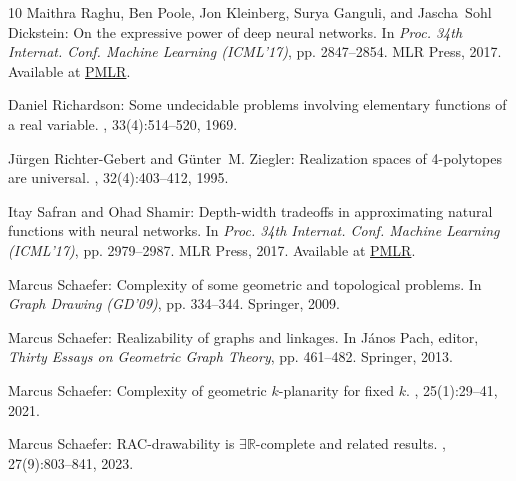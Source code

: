 \begin{thebibliography}{10}
{\sc Maithra Raghu, Ben Poole, Jon Kleinberg, Surya Ganguli, and Jascha~Sohl
  Dickstein}: On the expressive power of deep neural networks.
\newblock In {\em Proc. 34th Internat. Conf. Machine Learning (ICML'17)}, pp.
  2847--2854. MLR Press, 2017.
\newblock Available at
  \href{https://proceedings.mlr.press/v70/raghu17a.html}{PMLR}.

{\sc Daniel Richardson}: Some undecidable problems involving elementary
  functions of a real variable.
, 33(4):514--520, 1969.
\newblock [\epfmtdoi{10.2307/2271358}]

{\sc J{\"u}rgen Richter-Gebert and G{\"u}nter~M. Ziegler}: Realization spaces
  of 4-polytopes are universal.
, 32(4):403--412, 1995.
\newblock [\epfmtdoi{10.1090/S0273-0979-1995-00604-X}]

{\sc Itay Safran and Ohad Shamir}: Depth-width tradeoffs in approximating
  natural functions with neural networks.
\newblock In {\em Proc. 34th Internat. Conf. Machine Learning (ICML'17)}, pp.
  2979--2987. MLR Press, 2017.
\newblock Available at
  \href{https://proceedings.mlr.press/v70/safran17a.html}{PMLR}.

{\sc Marcus Schaefer}: Complexity of some geometric and topological problems.
\newblock In {\em Graph Drawing (GD'09)}, pp. 334--344. Springer, 2009.
\newblock [\epfmtdoi{10.1007/978-3-642-11805-0\_32}]

{\sc Marcus Schaefer}: Realizability of graphs and linkages.
\newblock In {\sc J{\'a}nos Pach}, editor, {\em Thirty Essays on Geometric
  Graph Theory}, pp. 461--482. Springer, 2013.
\newblock [\epfmtdoi{10.1007/978-1-4614-0110-0\_24}]

{\sc Marcus Schaefer}: Complexity of geometric $k$-planarity for fixed $k$.
, 25(1):29--41, 2021.

{\sc Marcus Schaefer}: {RAC}-drawability is $\exists\mathbb{R}$-complete and
  related results.
, 27(9):803--841, 2023.


\end{thebibliography}
